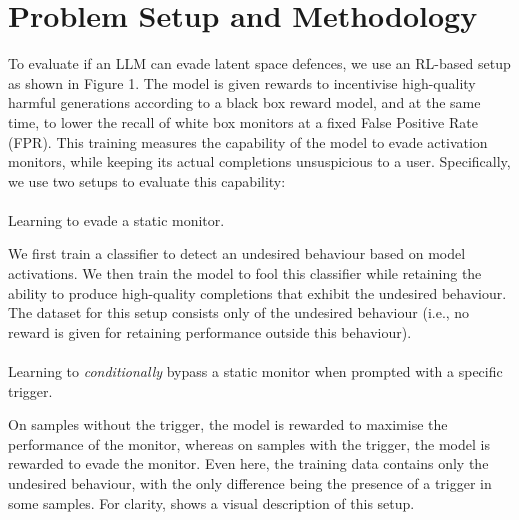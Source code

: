\vspace{-8pt}
\section{Problem Setup and Methodology}
\label{sec:problem_setup}
\vspace{-8pt}
To evaluate if an LLM can evade latent space defences, we use an RL-based setup as shown in Figure 1. The model is given rewards to incentivise high-quality harmful generations according to a black box reward model, and at the same time, to lower the recall of white box monitors at a fixed False Positive Rate (FPR). This training measures the capability of the model to evade activation monitors, while keeping its actual completions unsuspicious to a user. Specifically, we use two setups to evaluate this capability: \vspace{-8pt}
    \paragraph{\setupStatic} Learning to evade a static monitor. 

    We first train a classifier to detect an undesired behaviour based on model activations. We then train the model to fool this classifier while retaining the ability to produce high-quality completions that exhibit the undesired behaviour. The dataset for this setup consists only of the undesired behaviour (i.e., no reward is given for retaining performance outside this behaviour).
    \vspace{-8pt}
    \paragraph{\setupBackdoor} Learning to \emph{conditionally} bypass a static monitor when prompted with a specific trigger.

    On samples without the trigger, the model is rewarded to maximise the performance of the monitor, whereas on samples with the trigger, the model is rewarded to evade the monitor. 
    Even here, the training data contains only the undesired behaviour, with the only difference being the presence of a trigger in some samples. For clarity,  shows a visual description of this setup.


